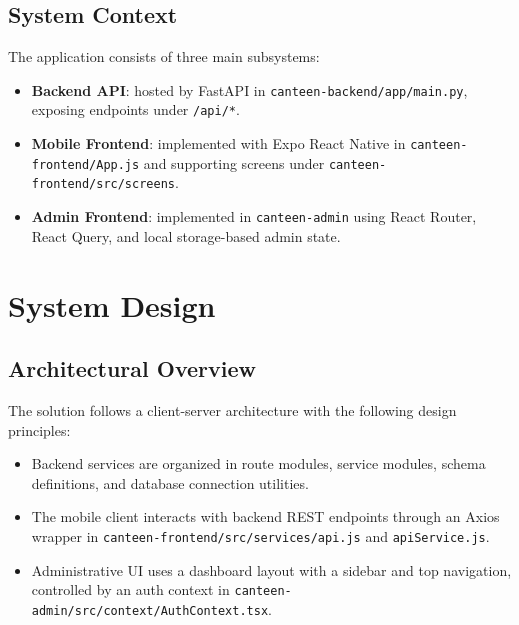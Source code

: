 \documentclass[12pt,a4paper]{report}
\begin{document}
\section{System Context}
The application consists of three main subsystems:
\begin{itemize}
  \item \textbf{Backend API}: hosted by FastAPI in \texttt{canteen-backend/app/main.py}, exposing endpoints under \texttt{/api/*}.
  \item \textbf{Mobile Frontend}: implemented with Expo React Native in \texttt{canteen-frontend/App.js} and supporting screens under \texttt{canteen-frontend/src/screens}.
  \item \textbf{Admin Frontend}: implemented in \texttt{canteen-admin} using React Router, React Query, and local storage-based admin state.
\end{itemize}

\chapter{System Design}
\section{Architectural Overview}
The solution follows a client-server architecture with the following design principles:
\begin{itemize}
  \item Backend services are organized in route modules, service modules, schema definitions, and database connection utilities.
  \item The mobile client interacts with backend REST endpoints through an Axios wrapper in \texttt{canteen-frontend/src/services/api.js} and \texttt{apiService.js}.
  \item Administrative UI uses a dashboard layout with a sidebar and top navigation, controlled by an auth context in \texttt{canteen-admin/src/context/AuthContext.tsx}.
\end{itemize}
\end{document}
